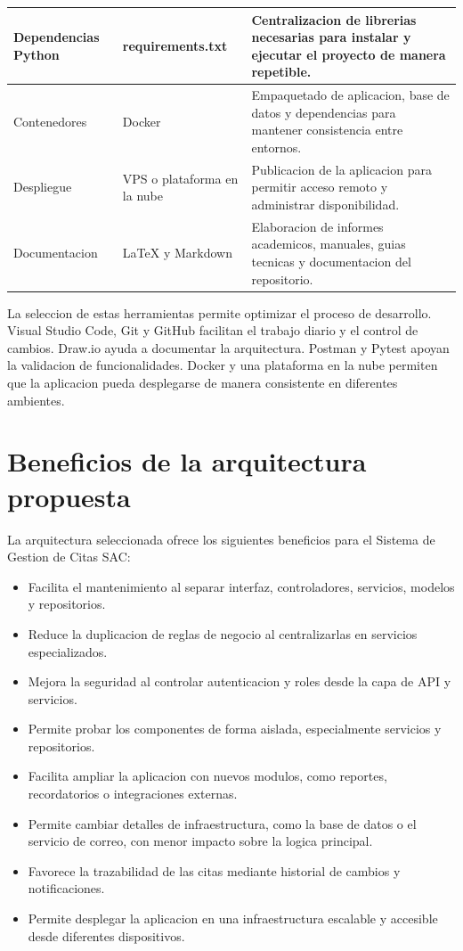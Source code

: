 \documentclass[12pt,letterpaper]{article}
\begin{document}
\begin{longtable}{|p{3.3cm}|p{4cm}|p{6.7cm}|}
Dependencias Python & requirements.txt & Centralizacion de librerias necesarias para instalar y ejecutar el proyecto de manera repetible. \\
\hline

Contenedores & Docker & Empaquetado de aplicacion, base de datos y dependencias para mantener consistencia entre entornos. \\
\hline

Despliegue & VPS o plataforma en la nube & Publicacion de la aplicacion para permitir acceso remoto y administrar disponibilidad. \\
\hline

Documentacion & LaTeX y Markdown & Elaboracion de informes academicos, manuales, guias tecnicas y documentacion del repositorio. \\
\hline
\end{longtable}

La seleccion de estas herramientas permite optimizar el proceso de desarrollo. Visual Studio Code, Git y GitHub facilitan el trabajo diario y el control de cambios. Draw.io ayuda a documentar la arquitectura. Postman y Pytest apoyan la validacion de funcionalidades. Docker y una plataforma en la nube permiten que la aplicacion pueda desplegarse de manera consistente en diferentes ambientes.

\section{Beneficios de la arquitectura propuesta}

La arquitectura seleccionada ofrece los siguientes beneficios para el Sistema de Gestion de Citas SAC:

\begin{itemize}[leftmargin=1.2cm]
    \item Facilita el mantenimiento al separar interfaz, controladores, servicios, modelos y repositorios.
    \item Reduce la duplicacion de reglas de negocio al centralizarlas en servicios especializados.
    \item Mejora la seguridad al controlar autenticacion y roles desde la capa de API y servicios.
    \item Permite probar los componentes de forma aislada, especialmente servicios y repositorios.
    \item Facilita ampliar la aplicacion con nuevos modulos, como reportes, recordatorios o integraciones externas.
    \item Permite cambiar detalles de infraestructura, como la base de datos o el servicio de correo, con menor impacto sobre la logica principal.
    \item Favorece la trazabilidad de las citas mediante historial de cambios y notificaciones.
    \item Permite desplegar la aplicacion en una infraestructura escalable y accesible desde diferentes dispositivos.
\end{itemize}
\end{document}
